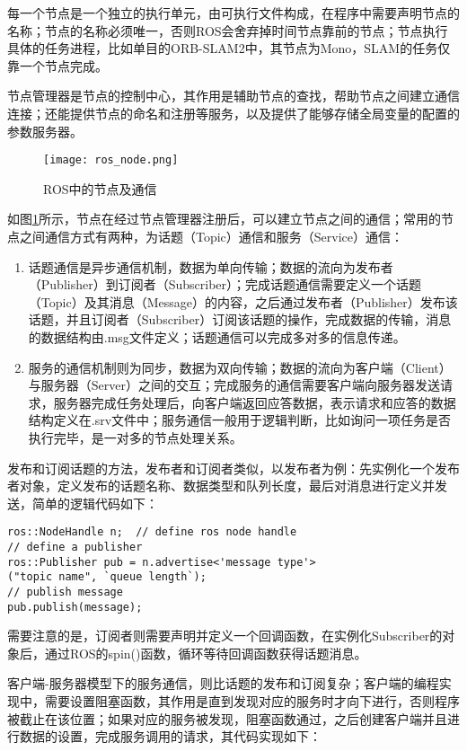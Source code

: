 每一个节点是一个独立的执行单元，由可执行文件构成，在程序中需要声明节点的名称；节点的名称必须唯一，否则ROS会舍弃掉时间节点靠前的节点；节点执行具体的任务进程，比如单目的ORB-SLAM2中，其节点为Mono，SLAM的任务仅靠一个节点完成。

节点管理器是节点的控制中心，其作用是辅助节点的查找，帮助节点之间建立通信连接；还能提供节点的命名和注册等服务，以及提供了能够存储全局变量的配置的参数服务器。

\begin{figure}[!ht]
\centering
\texttt{[image: ros\_node.png]}
\caption{ROS中的节点及通信} 
\label{fig2}
\end{figure}

如图\ref{fig2}所示，节点在经过节点管理器注册后，可以建立节点之间的通信；常用的节点之间通信方式有两种，为话题（Topic）通信和服务（Service）通信：
\begin{enumerate}
	\item 话题通信是异步通信机制，数据为单向传输；数据的流向为发布者（Publisher）到订阅者（Subscriber）；完成话题通信需要定义一个话题（Topic）及其消息（Message）的内容，之后通过发布者（Publisher）发布该话题，并且订阅者（Subscriber）订阅该话题的操作，完成数据的传输，消息的数据结构由.msg文件定义；话题通信可以完成多对多的信息传递。
	\item 
	服务的通信机制则为同步，数据为双向传输；数据的流向为客户端（Client）与服务器（Server）之间的交互；完成服务的通信需要客户端向服务器发送请求，服务器完成任务处理后，向客户端返回应答数据，表示请求和应答的数据结构定义在.srv文件中；服务通信一般用于逻辑判断，比如询问一项任务是否执行完毕，是一对多的节点处理关系。
\end{enumerate}

发布和订阅话题的方法，发布者和订阅者类似，以发布者为例：先实例化一个发布者对象，定义发布的话题名称、数据类型和队列长度，最后对消息进行定义并发送，简单的逻辑代码如下：

\begin{verbatim}
ros::NodeHandle n;  // define ros node handle
// define a publisher
ros::Publisher pub = n.advertise<'message type'>
("topic name", `queue length`);
// publish message
pub.publish(message);
\end{verbatim}

需要注意的是，订阅者则需要声明并定义一个回调函数，在实例化Subscriber的对象后，通过ROS的spin()函数，循环等待回调函数获得话题消息。

客户端-服务器模型下的服务通信，则比话题的发布和订阅复杂；客户端的编程实现中，需要设置阻塞函数，其作用是直到发现对应的服务时才向下进行，否则程序被截止在该位置；如果对应的服务被发现，阻塞函数通过，之后创建客户端并且进行数据的设置，完成服务调用的请求，其代码实现如下：

